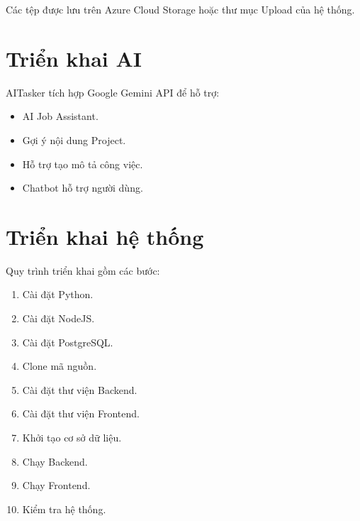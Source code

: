 Các tệp được lưu trên Azure Cloud Storage hoặc thư mục Upload của hệ thống.


\section{Triển khai AI}

AITasker tích hợp Google Gemini API để hỗ trợ:

\begin{itemize}

\item AI Job Assistant.

\item Gợi ý nội dung Project.

\item Hỗ trợ tạo mô tả công việc.

\item Chatbot hỗ trợ người dùng.

\end{itemize}


\section{Triển khai hệ thống}

Quy trình triển khai gồm các bước:

\begin{enumerate}

\item Cài đặt Python.

\item Cài đặt NodeJS.

\item Cài đặt PostgreSQL.

\item Clone mã nguồn.

\item Cài đặt thư viện Backend.

\item Cài đặt thư viện Frontend.

\item Khởi tạo cơ sở dữ liệu.

\item Chạy Backend.

\item Chạy Frontend.

\item Kiểm tra hệ thống.

\end{enumerate}

